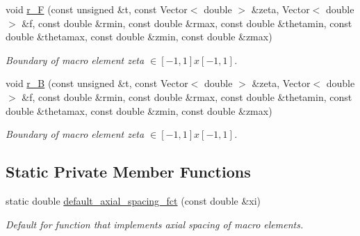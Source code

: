 \begin{DoxyCompactItemize}
void \hyperlink{classoomph_1_1QuarterPipeDomain_a85aaa5d1217c49e2144bbfd37dbad0fd}{r\+\_\+F} (const unsigned \&t, const Vector$<$ double $>$ \&zeta, Vector$<$ double $>$ \&f, const double \&rmin, const double \&rmax, const double \&thetamin, const double \&thetamax, const double \&zmin, const double \&zmax)
\begin{DoxyCompactList}\small\item\em Boundary of macro element zeta $ \in [-1,1]x[-1,1] $. \end{DoxyCompactList}\item 
void \hyperlink{classoomph_1_1QuarterPipeDomain_aba1af5e7f1bc6e88ff8e9ee59e965630}{r\+\_\+B} (const unsigned \&t, const Vector$<$ double $>$ \&zeta, Vector$<$ double $>$ \&f, const double \&rmin, const double \&rmax, const double \&thetamin, const double \&thetamax, const double \&zmin, const double \&zmax)
\begin{DoxyCompactList}\small\item\em Boundary of macro element zeta $ \in [-1,1]x[-1,1] $. \end{DoxyCompactList}\end{DoxyCompactItemize}
\subsection*{Static Private Member Functions}
\begin{DoxyCompactItemize}
\item 
static double \hyperlink{classoomph_1_1QuarterPipeDomain_a3b79d0bf40336f7961a8b2bb58080dba}{default\+\_\+axial\+\_\+spacing\+\_\+fct} (const double \&xi)
\begin{DoxyCompactList}\small\item\em Default for function that implements axial spacing of macro elements. \end{DoxyCompactList}\end{DoxyCompactItemize}
